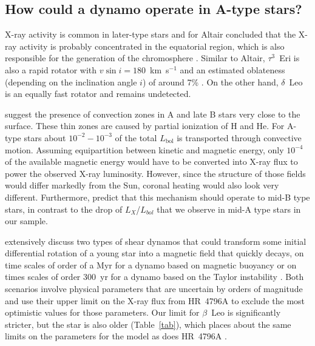 \documentclass[preprint2]{aastex631}
\begin{document}
\subsection{How could a dynamo operate in A-type stars?}
\label{sect:dynamos}

X-ray activity is common in later-type stars and for Altair
\citet{2009A&A...497..511R} concluded that the X-ray activity is
probably concentrated in the equatorial region, which is also
responsible for the generation of the chromosphere
\citep{1995ApJ...439.1011F}. Similar to Altair, $\tau^3$~Eri is also a
rapid rotator with $v\sin i=180$~km~s$^{-1}$ and an estimated oblateness
(depending on the inclination angle $i$) of around 7\%
\citep{2012A&ARv..20...51V}. On the other hand, $\delta$~Leo is an
equally fast rotator and remains undetected.

\citet{2019ApJ...883..106C} suggest the presence of 
convection zones in A and late B stars very close to the surface. These thin zones are caused
by partial ionization of H and He. For A-type stars about $10^{-2}-10^{-3}$ of the total $L_\mathrm{bol}$ is transported through convective motion. Assuming equipartition between kinetic and magnetic energy, only $10^{-4}$ of the available magnetic energy would have to be converted into X-ray flux to power the observed X-ray luminosity. However, since the structure of those fields would differ markedly from the Sun, coronal heating would also look very different. Furthermore, \citet{2019ApJ...883..106C} predict that this mechanism should operate to mid-B type stars, in contrast to the drop of $L_X$/$L_{bol}$ that we observe in mid-A type stars in our sample.


\citet{2014ApJ...786..136D} extensively discuss two types of shear
dynamos that could transform some initial differential rotation of a
young star into a magnetic field that quickly decays, on time scales
of order of a Myr for a dynamo based on magnetic buoyancy
\citep{1995MNRAS.272..528T} or on times scales of order 300~yr for a
dynamo based on the Taylor instability
\citep{2002A&A...381..923S,2006A&A...449..451B}. Both scenarios
involve physical parameters that are uncertain by orders of magnitude
and \citet{2014ApJ...786..136D} use their upper limit on the X-ray
flux from HR~4796A to exclude the most optimistic values for those
parameters. Our limit for $\beta$~Leo is significantly stricter, but
the star is also older (Table~\ref{tab}), which places about the same
limits on the parameters for the \citet{1995MNRAS.272..528T} model as
does HR~4796A \citep[See Fig 3 in][]{2014ApJ...786..136D}.
\end{document}
